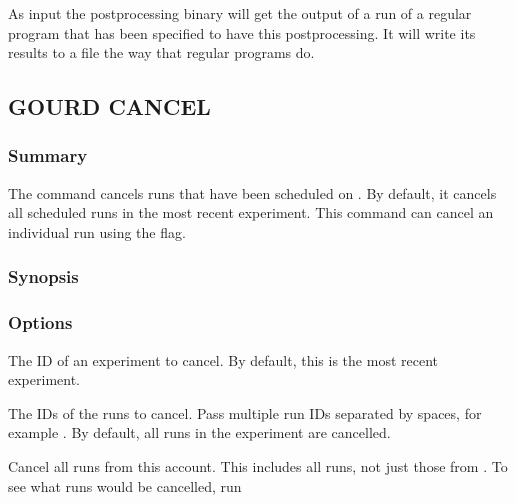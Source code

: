 \documentclass[a4paper,english]{article}
\begin{document}
\begin{adjustwidth}{18pt}{0pt}
                As input the postprocessing binary will get the output of a run of a regular program that has
                been specified to have this postprocessing. It will write its results to a file the way that
                regular programs do.


        \subsection{GOURD CANCEL}

            \subsubsection{Summary}
                The   command cancels runs that have been scheduled on .
                By default, it cancels all scheduled runs in the most recent experiment.
                This command can cancel an individual run using the  flag.

            \subsubsection{Synopsis}
                 

            \subsubsection{Options}
                \begin{Description}[Options]
                  \item[\Arg{experiment-id}]
                    The ID of an experiment to cancel.
                    By default, this is the most recent experiment.
                  \item[\OptArg{-i}{ run-ids}]
                    The IDs of the runs to cancel.
                    Pass multiple run IDs separated by spaces, for example .
                    By default, all runs in the experiment are cancelled.
                  \item[\Opt{--all}]
                    Cancel all runs from this account.
                    This includes all runs, not just those from .
                    To see what runs would be cancelled, run    
                \end{Description}



\end{adjustwidth}
\end{document}
